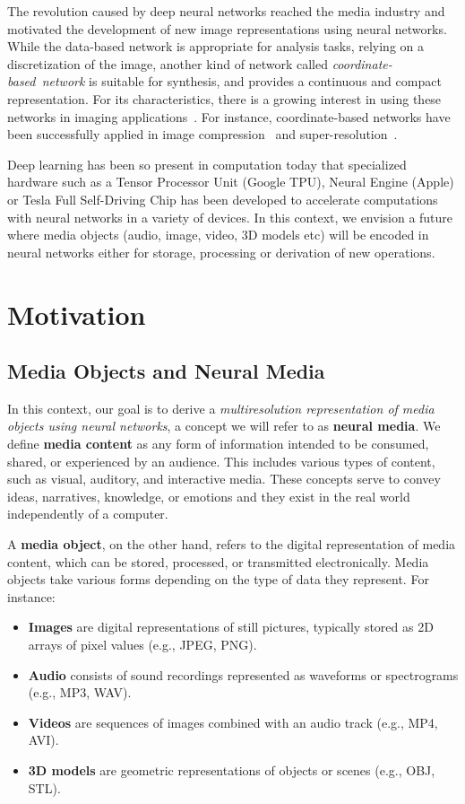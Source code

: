 The revolution caused by deep neural networks reached the media industry and motivated the development of new image representations using neural networks. While the data-based network is appropriate for analysis tasks, relying on a discretization of the image, another kind of network called \textit{coordinate-based~network} is suitable for synthesis, and provides a continuous and compact representation. For its characteristics, there is a growing interest in using these networks in imaging applications~\cite{xie2022neural}. For instance, coordinate-based networks have been successfully applied in image compression~\cite{dupont2021coin} and super-resolution~\cite{czerkawski2021neural}.

Deep learning has been so present in computation today that specialized hardware such as a Tensor Processor Unit (Google TPU), Neural Engine (Apple) or Tesla Full Self-Driving Chip has been developed to accelerate computations with neural networks in a variety of devices. In this context, we envision a future where media objects (audio, image, video, 3D models etc) will be encoded in neural networks either for storage, processing or derivation of new operations.

\section{Motivation}

\subsection{Media Objects and Neural Media}

In this context, our goal is to derive a \textit{multiresolution representation of media objects using neural networks}, a concept we will refer to as \textbf{neural media}. We define \textbf{media content} as any form of information intended to be consumed, shared, or experienced by an audience. This includes various types of content, such as visual, auditory, and interactive media. These concepts serve to convey ideas, narratives, knowledge, or emotions and they exist in the real world independently of a computer.

A \textbf{media object}, on the other hand, refers to the digital representation of media content, which can be stored, processed, or transmitted electronically. Media objects take various forms depending on the type of data they represent. For instance:

\begin{itemize}
\item \textbf{Images} are digital representations of still pictures, typically stored as 2D arrays of pixel values (e.g., JPEG, PNG).
\item \textbf{Audio} consists of sound recordings represented as waveforms or spectrograms (e.g., MP3, WAV).
\item \textbf{Videos} are sequences of images combined with an audio track (e.g., MP4, AVI).
\item \textbf{3D models} are geometric representations of objects or scenes (e.g., OBJ, STL).
\end{itemize}

